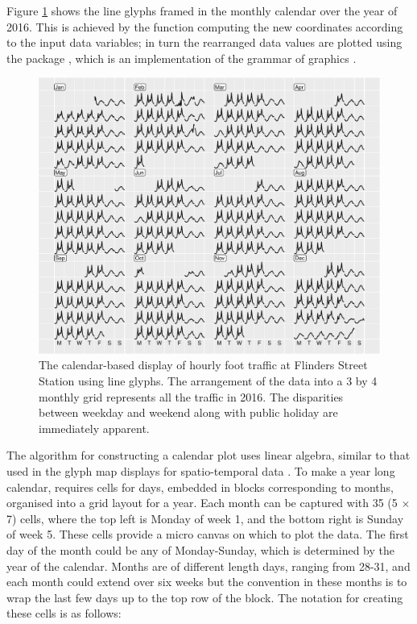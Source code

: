 \documentclass[article]{jss}
\begin{document}
Figure \ref{fig:flinders-2016} shows the line glyphs framed in the
monthly calendar over the year of 2016. This is achieved by the
 function computing the new coordinates according
to the input data variables; in turn the rearranged data values are
plotted using the  package \citep{R-ggplot2}, which is an
implementation of the grammar of graphics
\citep{wilkinson2006grammar, wickham2010layered}.

\begin{CodeChunk}
\begin{figure}

{\centering \includegraphics[width=\textwidth]{figure/flinders-2016-1} 

}

\caption[The calendar-based display of hourly foot traffic at Flinders Street Station using line glyphs]{The calendar-based display of hourly foot traffic at Flinders Street Station using line glyphs. The arrangement of the data into a 3 by 4 monthly grid represents all the traffic in 2016. The disparities between weekday and weekend along with public holiday are immediately apparent.}\label{fig:flinders-2016}
\end{figure}
\end{CodeChunk}

The algorithm for constructing a calendar plot uses linear algebra,
similar to that used in the glyph map displays for spatio-temporal data
\citep{Wickham2012glyph}. To make a year long calendar, requires cells
for days, embedded in blocks corresponding to months, organised into a
grid layout for a year. Each month can be captured with 35 (5 \(\times\)
7) cells, where the top left is Monday of week 1, and the bottom right
is Sunday of week 5. These cells provide a micro canvas on which to plot
the data. The first day of the month could be any of Monday-Sunday,
which is determined by the year of the calendar. Months are of different
length days, ranging from 28-31, and each month could extend over six
weeks but the convention in these months is to wrap the last few days up
to the top row of the block. The notation for creating these cells is as
follows:
\end{document}

